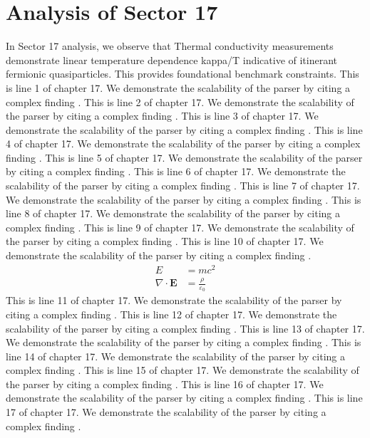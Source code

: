 \chapter{Analysis of Sector 17}

In Sector 17 analysis, we observe that Thermal conductivity measurements demonstrate linear temperature dependence kappa/T indicative of itinerant fermionic quasiparticles. This provides foundational benchmark constraints.
This is line 1 of chapter 17. We demonstrate the scalability of the parser by citing a complex finding \cite{ref17_1}.
This is line 2 of chapter 17. We demonstrate the scalability of the parser by citing a complex finding \cite{ref17_2}.
This is line 3 of chapter 17. We demonstrate the scalability of the parser by citing a complex finding \cite{ref17_3}.
This is line 4 of chapter 17. We demonstrate the scalability of the parser by citing a complex finding \cite{ref17_4}.
This is line 5 of chapter 17. We demonstrate the scalability of the parser by citing a complex finding \cite{ref17_5}.
This is line 6 of chapter 17. We demonstrate the scalability of the parser by citing a complex finding \cite{ref17_6}.
This is line 7 of chapter 17. We demonstrate the scalability of the parser by citing a complex finding \cite{ref17_7}.
This is line 8 of chapter 17. We demonstrate the scalability of the parser by citing a complex finding \cite{ref17_8}.
This is line 9 of chapter 17. We demonstrate the scalability of the parser by citing a complex finding \cite{ref17_9}.
This is line 10 of chapter 17. We demonstrate the scalability of the parser by citing a complex finding \cite{ref17_10}.
\begin{align*}
  E &= mc^2 \\
  \nabla \cdot \mathbf{E} &= \frac{\rho}{\varepsilon_0}
\end{align*}
This is line 11 of chapter 17. We demonstrate the scalability of the parser by citing a complex finding \cite{ref17_11}.
This is line 12 of chapter 17. We demonstrate the scalability of the parser by citing a complex finding \cite{ref17_12}.
This is line 13 of chapter 17. We demonstrate the scalability of the parser by citing a complex finding \cite{ref17_13}.
This is line 14 of chapter 17. We demonstrate the scalability of the parser by citing a complex finding \cite{ref17_14}.
This is line 15 of chapter 17. We demonstrate the scalability of the parser by citing a complex finding \cite{ref17_15}.
This is line 16 of chapter 17. We demonstrate the scalability of the parser by citing a complex finding \cite{ref17_16}.
This is line 17 of chapter 17. We demonstrate the scalability of the parser by citing a complex finding \cite{ref17_17}.
